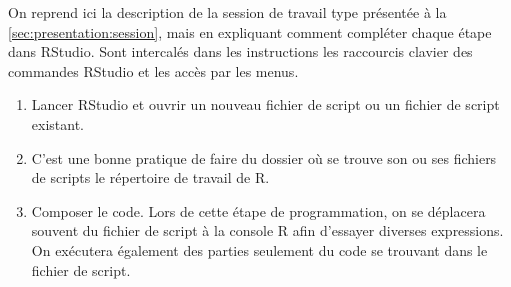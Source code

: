 On reprend ici la description de la session de travail type présentée
à la \autoref{sec:presentation:session}, mais en expliquant comment
compléter chaque étape dans RStudio. Sont intercalés dans les
instructions les raccourcis clavier des commandes RStudio et les accès
par les menus.

\begin{enumerate}
\item Lancer RStudio et ouvrir un nouveau fichier de script ou un
  fichier de script existant.
\item C'est une bonne pratique de faire du dossier où se trouve son ou
  ses fichiers de scripts le répertoire de travail de R.
\item Composer le code. Lors de cette étape de programmation, on se
  déplacera souvent du fichier de script à la console R afin
  d'essayer diverses expressions. On exécutera également des parties
  seulement du code se trouvant dans le fichier de script.
\end{enumerate}
